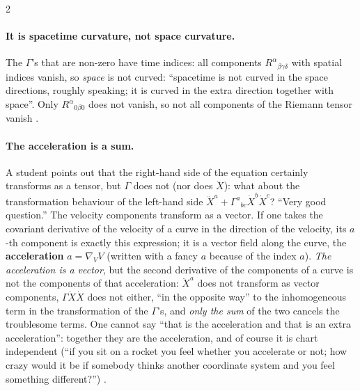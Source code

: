 \begin{paracol}{2}
\paragraph{It is spacetime curvature, not space curvature.} The $\Gamma$'s that are non-zero have time indices: all components $R^\alpha{}_{\beta\gamma\delta}$ with spatial indices vanish, so \emph{space} is not curved: ``spacetime is not curved in the space directions, roughly speaking; it is curved in the extra direction together with space''. Only $R^\alpha{}_{0\beta0}$ does not vanish, so not all components of the Riemann tensor vanish .

\paragraph{The acceleration is a sum.} A student points out that the right-hand side of the equation certainly transforms as a tensor, but $\Gamma$ does not (nor does $\ddot X$): what about the transformation behaviour of the left-hand side $\ddot X^a+\Gamma^a{}_{bc}\dot X^b\dot X^c$? ``Very good question.'' The velocity components transform as a vector. If one takes the covariant derivative of the velocity of a curve in the direction of the velocity, its $a$-th component is exactly this expression; it is a vector field along the curve, the \textbf{acceleration} $a=\nabla_VV$ (written with a fancy $a$ because of the index $a$). \emph{The acceleration is a vector}, but the second derivative of the components of a curve is not the components of that acceleration: $\ddot X^a$ does not transform as vector components, $\Gamma\dot X\dot X$ does not either, ``in the opposite way'' to the inhomogeneous term in the transformation of the $\Gamma$'s, and \emph{only the sum} of the two cancels the troublesome terms. One cannot say ``that is the acceleration and that is an extra acceleration'': together they are the acceleration, and of course it is chart independent (``if you sit on a rocket you feel whether you accelerate or not; how crazy would it be if somebody thinks another coordinate system and you feel something different?'')
.


\end{paracol}
